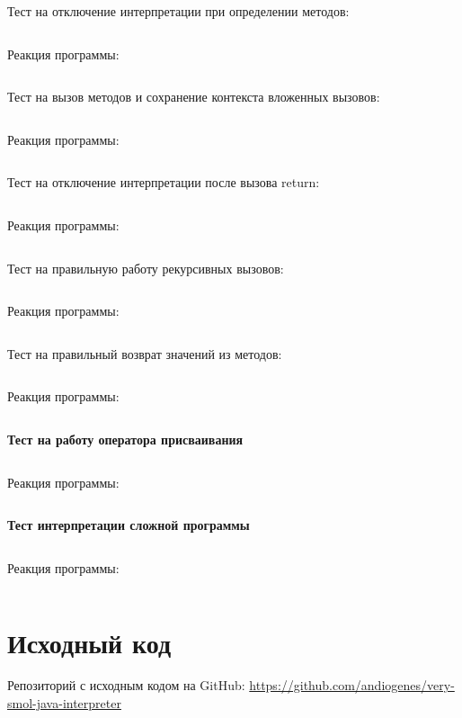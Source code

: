 \documentclass[a4paper,12pt]{article}
\begin{document}
Тест на отключение интерпретации при определении методов:
\inputminted[breaklines,frame=lines,linenos]{java}{../src/test/fun-test/statements/MethodDefinition.java}
Реакция программы:
\inputminted[breaklines,frame=lines,linenos]{text}{../src/test/fun-test/statements/MethodDefinition.java.out}
Тест на вызов методов и сохранение контекста вложенных вызовов:
\inputminted[breaklines,frame=lines,linenos]{java}{../src/test/fun-test/statements/MethodCall.java}
Реакция программы:
\inputminted[breaklines,frame=lines,linenos]{text}{../src/test/fun-test/statements/MethodCall.java.out}
Тест на отключение интерпретации после вызова return:
\inputminted[breaklines,frame=lines,linenos]{java}{../src/test/fun-test/statements/NoStatementsAfterReturn.java}
Реакция программы:
\inputminted[breaklines,frame=lines,linenos]{text}{../src/test/fun-test/statements/NoStatementsAfterReturn.java.out}
Тест на правильную работу рекурсивных вызовов:
\inputminted[breaklines,frame=lines,linenos]{java}{../src/test/fun-test/statements/Recursion.java}
Реакция программы:
\inputminted[breaklines,frame=lines,linenos]{text}{../src/test/fun-test/statements/Recursion.java.out}
Тест на правильный возврат значений из методов:
\inputminted[breaklines,frame=lines,linenos]{java}{../src/test/fun-test/statements/ReturnValue.java}
Реакция программы:
\inputminted[breaklines,frame=lines,linenos]{text}{../src/test/fun-test/statements/ReturnValue.java.out}
\textbf{Тест на работу оператора присваивания}
\inputminted[breaklines,frame=lines,linenos]{java}{../src/test/fun-test/other/Assignment.java}
Реакция программы:
\inputminted[breaklines,frame=lines,linenos]{text}{../src/test/fun-test/other/Assignment.java.out}
\textbf{Тест интерпретации сложной программы}
\inputminted[breaklines,frame=lines,linenos]{java}{../src/test/fun-test/other/Complex.java}
Реакция программы:
\inputminted[breaklines,frame=lines,linenos]{text}{../src/test/fun-test/other/Complex.java.out}
\newpage
\section{Исходный код}
\begin{flushleft}
  Репозиторий с исходным кодом на GitHub: \url{https://github.com/andiogenes/very-smol-java-interpreter}
\end{flushleft}
\end{document}

